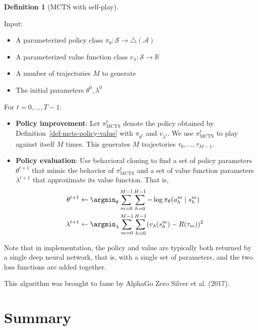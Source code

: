 \documentclass[
  letterpaper,
  DIV=11,
  numbers=noendperiod]{scrreprt}
\providecommand{\tightlist}{%
  \setlength{\itemsep}{0pt}\setlength{\parskip}{0pt}}\usepackage{longtable,booktabs,array}
\theoremstyle{plain}
\theoremstyle{plain}
\theoremstyle{definition}
\theoremstyle{definition}
\newtheorem{definition}{Definition}[chapter]
\theoremstyle{remark}
\begin{document}
\begin{definition}[MCTS with
self-play]\protect\hypertarget{def-mcts-self-play}{}\label{def-mcts-self-play}

Input:

\begin{itemize}
\tightlist
\item
  A parameterized policy class
  \(\pi_\theta : \mathcal{S} \to \triangle(\mathcal{A})\)
\item
  A parameterized value function class
  \(v_\lambda : \mathcal{S} \to \mathbb{R}\)
\item
  A number of trajectories \(M\) to generate
\item
  The initial parameters \(\theta^0, \lambda^0\)
\end{itemize}

For \(t = 0, \dots, T-1\):

\begin{itemize}
\tightlist
\item
  \textbf{Policy improvement}: Let \(\pi^t_\text{MCTS}\) denote the
  policy obtained by Definition~\ref{def-mcts-policy-value} with
  \(\pi_{\theta^t}\) and \(v_{\lambda^t}\). We use \(\pi^t_\text{MCTS}\)
  to play against itself \(M\) times. This generates \(M\) trajectories
  \(\tau_0, \dots, \tau_{M-1}\).
\item
  \textbf{Policy evaluation}: Use behavioral cloning to find a set of
  policy parameters \(\theta^{t+1}\) that mimic the behavior of
  \(\pi^t_\text{MCTS}\) and a set of value function parameters
  \(\lambda^{t+1}\) that approximate its value function. That is, \[
  \begin{aligned}
  \theta^{t+1} &\gets \argmin_\theta \sum_{m=0}^{M-1} \sum_{h=0}^{H-1} - \log \pi_\theta(a^m_h\mid s^m_h) \\
  \lambda^{t+1} &\gets \argmin_\lambda \sum_{m=0}^{M-1} \sum_{h=0}^{H-1} (v_\lambda(s^m_h) - R(\tau_m))^2
  \end{aligned}
  \]
\end{itemize}

Note that in implementation, the policy and value are typically both
returned by a single deep neural network, that is, with a single set of
parameters, and the two loss functions are added together.

\end{definition}

This algorithm was brought to fame by AlphaGo Zero Silver et al. (2017).

\section{Summary}\label{summary-6}
\end{document}
